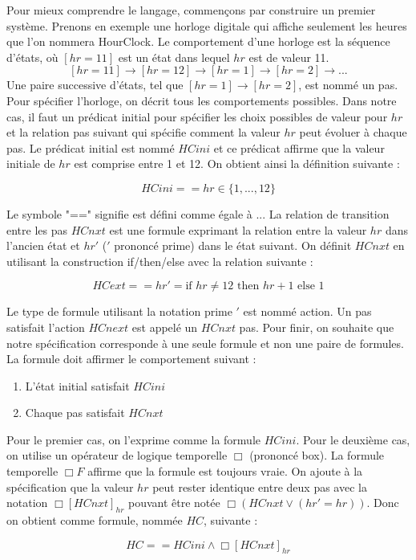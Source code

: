 \documentclass[12pt,a4paper]{article}
\begin{document}
Pour mieux comprendre le langage, commençons par construire un premier système. Prenons en exemple une horloge digitale qui affiche seulement les heures que l'on nommera HourClock. Le comportement d'une horloge est la séquence d'états, où $[hr = 11]$ est un état dans lequel $ hr $ est de valeur 11.
$$ [hr = 11] \rightarrow [hr = 12] \rightarrow [hr = 1] \rightarrow [hr = 2] \rightarrow ...$$
Une paire successive d'états, tel que $[hr = 1] \rightarrow [hr = 2]$, est nommé un pas.
Pour spécifier l'horloge, on décrit tous les comportements possibles. Dans notre cas, il faut un prédicat initial pour spécifier les choix possibles de valeur pour $hr$ et la relation pas suivant qui spécifie comment la valeur $hr$ peut évoluer à chaque pas.
Le prédicat initial est nommé $HCini$ et ce prédicat affirme que la valeur initiale de $hr$ est comprise entre 1 et 12. On obtient ainsi la définition suivante :

$$ HCini == hr \in \{1,...,12\}$$

Le symbole "==" signifie est défini comme égale à ... 
La relation de transition entre les pas $HCnxt$ est une formule exprimant la relation entre la valeur $hr$ dans l'ancien état et $hr'$ ($'$ prononcé prime) dans le état suivant. On définit $HCnxt$ en utilisant la construction if/then/else avec la relation suivante :   

$$ HCext == hr' = \text{if } hr \neq 12 \text{ then } hr + 1 \text{ else } 1 $$

Le type de formule utilisant la notation prime $'$ est nommé action. Un pas satisfait l'action $HCnext$ est appelé un $HCnxt$ pas.
Pour finir, on souhaite que notre spécification corresponde à une seule formule et non une paire de formules. La formule doit affirmer le comportement suivant :
\begin{enumerate}
	\item L'état initial satisfait $HCini$
	\item Chaque pas satisfait $HCnxt$
\end{enumerate}
Pour le premier cas, on l'exprime comme la formule $HCini$. Pour le deuxième cas, on utilise un opérateur de logique temporelle $\Box$ (prononcé box). La formule temporelle $\Box F$ affirme que la formule est toujours vraie. On ajoute à la spécification que la valeur $hr$ peut rester identique entre deux pas avec la notation $\Box [HCnxt]_{hr}$ pouvant être notée $\Box (HCnxt \lor (hr' = hr ))$. Donc on obtient comme formule, nommée $HC$, suivante :

$$ HC == HCini  \land  \Box [HCnxt]_{hr} $$
\end{document}
